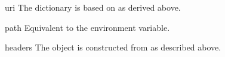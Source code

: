 \begin{datadesc}{uri}
The dictionary is based on  as derived above.
\end{datadesc}

\begin{datadesc}{path}
Equivalent to the  environment variable.
\end{datadesc}

\begin{datadesc}{headers}
The  object is constructed from  as described
above.
\end{datadesc}


\begin{seealso}
\end{seealso}
